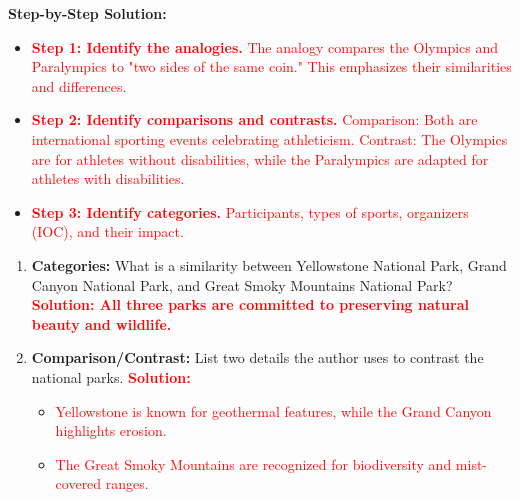\documentclass[12pt]{article}
\begin{document}
\begin{tcolorbox}[colframe=black!60, colback=white, 
coltitle=black, colbacktitle=black!15, fonttitle=\bfseries\Large, 
title=Text: The Olympics and the Paralympics, halign title=center, left=10pt, right=10pt, top=10pt, bottom=15pt]
\textbf{Step-by-Step Solution:}
\begin{itemize}
    \item \textcolor{red}{\textbf{Step 1: Identify the analogies.}}  
    \textcolor{red}{The analogy compares the Olympics and Paralympics to "two sides of the same coin." This emphasizes their similarities and differences.}
    \item \textcolor{red}{\textbf{Step 2: Identify comparisons and contrasts.}}  
    \textcolor{red}{Comparison: Both are international sporting events celebrating athleticism.}  
    \textcolor{red}{Contrast: The Olympics are for athletes without disabilities, while the Paralympics are adapted for athletes with disabilities.}
    \item \textcolor{red}{\textbf{Step 3: Identify categories.}}  
    \textcolor{red}{Participants, types of sports, organizers (IOC), and their impact.}
\end{itemize}
\end{tcolorbox}

\vspace{2em}

\begin{tcolorbox}[colframe=black!60, colback=white, 
coltitle=black, colbacktitle=black!15, fonttitle=\bfseries\Large, 
title=Guided Practice, halign title=center, left=10pt, right=10pt, top=10pt, bottom=15pt]
\begin{enumerate}[itemsep=1em]
    \item \textbf{Categories:} What is a similarity between Yellowstone National Park, Grand Canyon National Park, and Great Smoky Mountains National Park?  
    \textcolor{red}{\textbf{Solution: All three parks are committed to preserving natural beauty and wildlife.}}
    \item \textbf{Comparison/Contrast:} List two details the author uses to contrast the national parks.  
    \textcolor{red}{\textbf{Solution:}}
    \begin{itemize}
        \item \textcolor{red}{Yellowstone is known for geothermal features, while the Grand Canyon highlights erosion.}  
        \item \textcolor{red}{The Great Smoky Mountains are recognized for biodiversity and mist-covered ranges.}
    \end{itemize}
\end{enumerate}
\end{tcolorbox}
\end{document}
